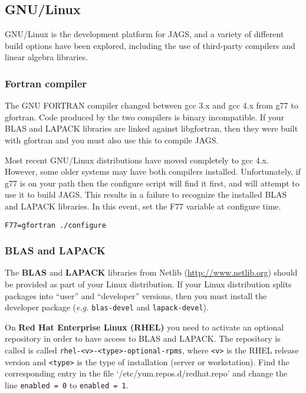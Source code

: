 \documentclass[11pt, a4paper, titlepage]{article}
\newcommand{\JAGS}{\textsf{JAGS}}
\newcommand{\code}[1]{{\bgroup{\normalfont\ttfamily #1}\egroup}}
\newcommand{\file}[1]{{`\normalfont\textsf{#1}'}}
\begin{document}
\subsection{GNU/Linux}
\label{section:gnulinux}

GNU/Linux is the development platform for \JAGS, and a variety of
different build options have been explored, including the use of
third-party compilers and linear algebra libraries.

\subsubsection{Fortran compiler}

The GNU FORTRAN compiler changed between gcc 3.x and gcc 4.x from
\code{g77} to \code{gfortran}. Code produced by the two compilers is
binary incompatible. If your BLAS and LAPACK libraries are linked
against \code{libgfortran}, then they were built with \code{gfortran}
and you must also use this to compile \JAGS. 

Most recent GNU/Linux distributions have moved completely to gcc 4.x.
However, some older systems may have both compilers installed.
Unfortunately, if \code{g77} is on your path then the configure script
will find it first, and will attempt to use it to build \JAGS. This
results in a failure to recognize the installed BLAS and LAPACK
libraries. In this event, set the \code{F77} variable at configure time.
\begin{verbatim}
F77=gfortran ./configure
\end{verbatim}

\subsubsection{BLAS and LAPACK}

The {\bf BLAS} and {\bf LAPACK} libraries from Netlib
(\url{http://www.netlib.org}) should be provided as part of your Linux
distribution. If your Linux distribution splits packages into ``user''
and ``developer'' versions, then you must install the developer
package ({\em e.g.}  \texttt{blas-devel} and \texttt{lapack-devel}).

On {\bf Red Hat Enterprise Linux (RHEL)} you need to activate an
optional repository in order to have access to BLAS and LAPACK.  The
repository is called is called \texttt{rhel-<v>-<type>-optional-rpms},
where \texttt{<v>} is the RHEL release version and \texttt{<type>} is
the type of installation (server or workstation). Find the
corresponding entry in the file \file{/etc/yum.repos.d/redhat.repo}
and change the line \texttt{enabled = 0} to \texttt{enabled = 1}.
\end{document}
